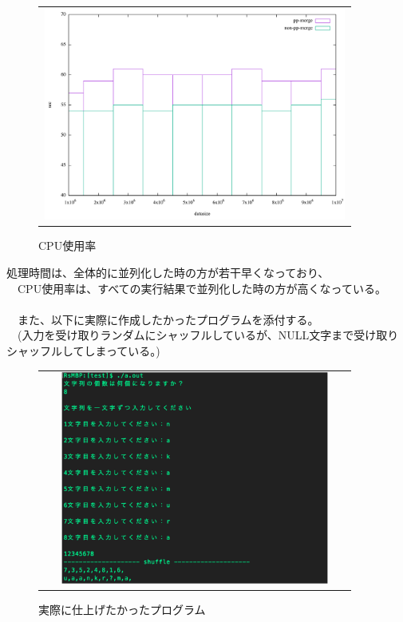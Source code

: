 \documentclass[11pt,a4paper]{jsarticle}
\begin{document}
\newpage
\begin{figure}[htbp]
 \begin{tabular}{c}
  \begin{minipage}{0.5\hsize}
   \begin{center}
   \includegraphics[width=10cm,height=7cm,angle=0]{cpu_graph.pdf}
   \caption{CPU使用率}
   \end{center}
  \end{minipage}
 \end{tabular}
\end{figure}
処理時間は、全体的に並列化した時の方が若干早くなっており、\\
　CPU使用率は、すべての実行結果で並列化した時の方が高くなっている。\\
\\
　また、以下に実際に作成したかったプログラムを添付する。\\
　(入力を受け取りランダムにシャッフルしているが、NULL文字まで受け取りシャッフルしてしまっている。)
\begin{figure}[htbp]
 \begin{tabular}{c}
  \begin{minipage}{0.5\hsize}
   \begin{center}
   \includegraphics[width=10cm,height=7cm,angle=0]{image4-crop.pdf}
   \caption{実際に仕上げたかったプログラム}
   \end{center}
  \end{minipage}
 \end{tabular}
\end{figure}
\end{document}
